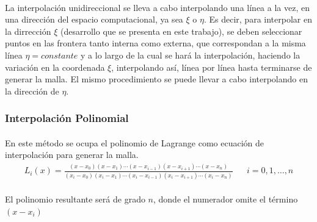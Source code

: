 \documentclass[letterpaper, openright, 12pt]{book}
\begin{document}
    \paragraph*{}
    La interpolación unidireccional se lleva a cabo interpolando una línea
    a la vez, en una dirección del espacio computacional, ya sea $\xi$ o
    $\eta$. Es decir, para interpolar en la dirrección $\xi$ (desarrollo que
    se presenta en este trabajo), se deben seleccionar puntos en las
    frontera tanto interna como externa, que correspondan a la misma línea
    $\eta = constante$ y a lo largo de la cual se hará la interpolación,
    haciendo la variación en la coordenada $\xi$, interpolando así, línea
    por línea hasta terminarse de generar la malla. El mismo procedimiento
    se puede llevar a cabo interpolando en la dirección de $\eta$.

    \subsubsection{Interpolación Polinomial}\label{Lagrange}
    \paragraph*{}
    En este método se ocupa el polinomio de Lagrange como ecuación de
    interpolación para generar la malla.
    \begin{align}
        L_{i}(x) = \frac{(x - x_{0})(x - x_{1})
                \dotsb (x - x_{i-1}) (x - x_{i+1})
                \dotsb (x - x_{n})}{(x_{i} - x_{0} )(x_{i} - x_{1})
                \dotsb (x_{i} - x_{i-1}) (x_{i} - x_{i+1})
                \dotsb (x_{i} - x_{n}) } && i = 0, 1, \dotsc , n
    \end{align}
    \\El polinomio resultante será de grado $n$, donde el numerador omite el
    término $(x - x_{i})$
\end{document}
